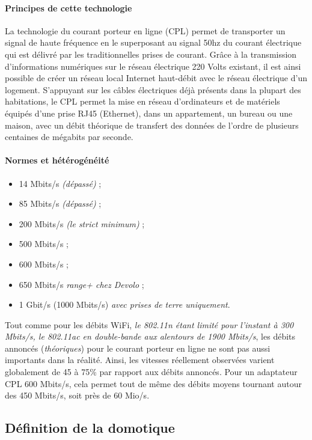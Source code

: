             \paragraph{Principes de cette technologie}
La technologie du courant porteur en ligne (CPL) permet de transporter un signal de haute fréquence en le superposant au signal 50hz du courant électrique qui est délivré par les traditionnelles prises de courant.
Grâce à la transmission d'informations numériques sur le réseau électrique 220 Volts existant, il est ainsi possible de créer un réseau local Internet haut-débit avec le réseau électrique d'un logement.
S'appuyant sur les câbles électriques déjà présents dans la plupart des habitations, le CPL permet la mise en réseau d'ordinateurs et de matériels équipés d'une prise RJ45 (Ethernet), dans un appartement, un bureau ou une maison, avec un débit théorique de transfert des données de l'ordre de plusieurs centaines de mégabits par seconde.
            \paragraph{Normes et hétérogénéité}
                \begin{itemize}
                    \item 14 Mbits/s \emph{(dépassé)} ;
                    \item 85 Mbits/s \emph{(dépassé)} ;
                    \item 200 Mbits/s \emph{(le strict minimum)} ;
                    \item 500 Mbits/s ;
                    \item 600 Mbits/s ;
                    \item 650 Mbits/s \emph{range+ chez Devolo} ;
                    \item 1 Gbit/s (1000 Mbits/s) \emph{avec prises de terre uniquement}.
                \end{itemize}
Tout comme pour les débits WiFi, \emph{ le \emph{802.11n} étant limité pour l'instant à 300 Mbits/s, le \emph{802.11ac} en double-bande aux alentours de 1900 Mbits/s}, les débits annoncés (\emph{théoriques}) pour le courant porteur en ligne ne sont pas aussi importants dans la réalité.
Ainsi, les vitesses réellement observées varient globalement de 45 à 75\% par rapport aux débits annoncés.
Pour un adaptateur CPL 600 Mbits/s, cela permet tout de même des débits moyens tournant autour des 450 Mbits/s, soit près de 60 Mio/s.

        \subsection{Définition de la domotique}
